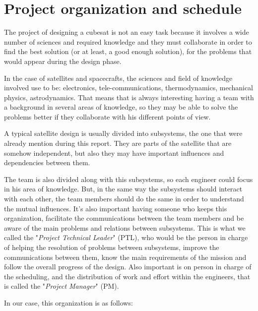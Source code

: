 \section{Project organization and schedule}

The project of designing a cubesat is not an easy task because it involves a
wide number of sciences and required knowledge and they must collaborate in
order to find the best solution (or at least, a good enough solution), for the
problems that would appear during the design phase.

In the case of satellites and spacecrafts, the sciences and field of knowledge
involved use to be: electronics, tele-communications, thermodynamics, mechanical
physics, astrodynamics. That means that is always interesting having a team with
a background in several areas of knowledge, so they may be able to solve the problems
better if they collaborate with his different points of view.

A typical satellite design is usually divided into subsystems, the one that were
already mention during this report. They are parts of the satellite that are
somehow independent, but also they may have important influences and dependencies
between them.

The team is also divided along with this subsystems, so each engineer could focus in
his area of knowledge. But, in the same way the subsystems should interact with each
other, the team members should do the same in order to understand the mutual influences.
It's also important having someone who keeps this organization, facilitate the
communications between the team members and be aware of the main problems and
relations between subsystems. This is what we called the "\textit{Project Technical Leader}" (PTL),
who would be the person in charge of helping the resolution of problems between
subsystems, improve the communications between them, know the main requirements of
the mission and follow the overall progress of the design. Also important is on
person in charge of the scheduling, and the distribution of work
and effort within the engineers, that is called the "\textit{Project Manager}" (PM).

In our case, this organization is as follows:

